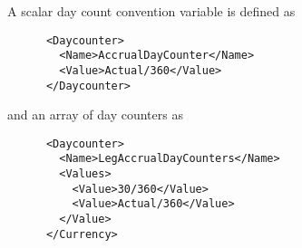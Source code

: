 A scalar day count convention variable is defined as

\begin{verbatim}
      <Daycounter>
        <Name>AccrualDayCounter</Name>
        <Value>Actual/360</Value>
      </Daycounter>
\end{verbatim}

and an array of day counters as

\begin{verbatim}
      <Daycounter>
        <Name>LegAccrualDayCounters</Name>
        <Values>
          <Value>30/360</Value>
          <Value>Actual/360</Value>
        </Value>
      </Currency>
\end{verbatim}
